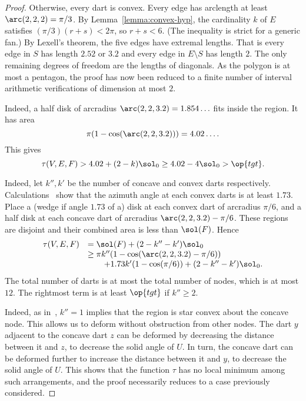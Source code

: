 \begin{proof}
  Otherwise, every dart is convex.
Every edge has
arclength at least $\arc(2,2,2)=\pi/3$.  By
Lemma~\ref{lemma:convex-hyp}, the cardinality $k$ of $E$ satisfies
$(\pi/3)(r+s) < 2\pi$, so $r+s<6$.   (The inequality is strict for a generic fan.)  
By Lexell's theorem, the five edges have extremal lengths.
That is every edge
in $S$ has length $2.52$ or $3.2$ and every edge in $E\setminus S$ has length $2$.
The only remaining degrees of freedom are the lengths of
diagonals.  As the polygon is at most a pentagon, the proof has now
been reduced to a finite number of interval arithmetic verifications
of dimension at most $2$.  

  Indeed, a
  half disk of arcradius $\arc(2,2,3.2)=1.854\ldots$ fits inside the
  region.  It has area
\begin{displaymath}
\pi(1-\cos(\arc(2,2,3.2)))=4.02\ldots.
\end{displaymath}
This gives
\begin{displaymath}
\tau(V,E,F) > 4.02 + (2-k)\sol_0 \ge 4.02 -4 \sol_0 > \op{tgt}.
\end{displaymath}
%


 Indeed, 
let $k'',k'$ be the number of concave and convex darts respectively.
Calculations~\cite[cc:lft]{hales:2009:nonlinear} show that the azimuth
angle at each convex darts is at least $1.73$.  Place a (wedge if
angle $1.73$ of a) disk at each convex dart of arcradius $\pi/6$, and
a half disk at each concave dart of arcradius $\arc(2,2,3.2)-\pi/6$.
These regions are disjoint and their combined area is less than
$\sol(F)$.  Hence
\begin{displaymath}
\begin{array}{lll}
\tau(V,E,F)&=\sol(F)+(2-k''-k')\sol_0 \\
&\ge \pi k'' (1-\cos(\arc(2,2,3.2)-\pi/6)) \\
&\qquad+ 1.73 k' (1-\cos(\pi/6)) + (2-k''-k')\sol_0.
\end{array}
\end{displaymath}
The total number of darts is at most the total number of nodes, which
is at most $12$.  The rightmost term is at least $\op{tgt}$ if $k''\ge
2$.   

 Indeed,
as in~\cite{Hales:2006:DCG}, $k''=1$ implies that the region is star
convex about the concave node.  This allows us to deform without
obstruction from other nodes.  The dart $y$ adjacent to the concave
dart $z$ can be deformed by decreasing the distance between it and
$z$, to decrease the solid angle of $U$.  In turn, the concave dart
can be deformed further to increase the distance between it and $y$,
to decrease the solid angle of $U$.  This shows that the function
$\tau$ has no local minimum among such arrangements, and the proof
necessarily reduces to a case previously considered.  
%
%



\end{proof}
